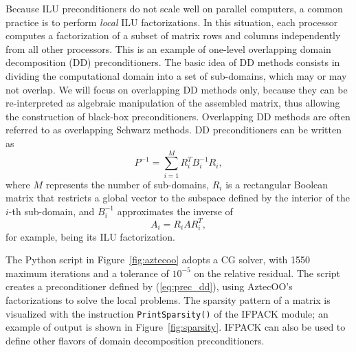 \documentclass[acmtocl]{acmtrans2m}
\begin{document}
Because ILU preconditioners do not scale well on parallel computers, a
common practice is to perform {\em local} ILU factorizations.  In this
situation, each processor computes a factorization of a subset of
matrix rows and columns independently from all other processors.  This
is an example of one-level overlapping domain decomposition (DD)
preconditioners.  The basic idea of DD methods consists in dividing
the computational domain into a set of sub-domains, which may or may
not overlap.  We will focus on overlapping DD methods only, because
they can be re-interpreted as algebraic manipulation of the assembled
matrix, thus allowing the construction of black-box preconditioners.
Overlapping DD methods are often referred to as overlapping Schwarz
methods.  DD preconditioners can be written as
\begin{equation}
  \label{eq:prec_dd}
  P^{-1} = \sum_{i=1}^M R_i^T B_i^{-1} R_i,
\end{equation}
where $M$ represents the number of sub-domains, $R_i$ is a rectangular
Boolean matrix that restricts a global vector to the subspace defined
by the interior of the $i$-th sub-domain, and $B_i^{-1}$ approximates
the inverse of
\begin{equation}
  \label{eq:aztecoo_tilde_a}
  A_i = R_i A R_i^T,
\end{equation}
for example, being its ILU factorization.

\medskip

The Python script in Figure~\ref{fig:aztecoo} adopts a CG solver, with
1550 maximum iterations and a tolerance of $10^{-5}$ on the relative
residual.  The script creates a preconditioner defined by
(\ref{eq:prec_dd}), using AztecOO's factorizations to solve the local
problems.  The sparsity pattern of a matrix is visualized with the
instruction {\tt PrintSparsity()} of the IFPACK module; an example of
output is shown in Figure~\ref{fig:sparsity}.  IFPACK can also be used
to define other flavors of domain decomposition preconditioners.
\end{document}
